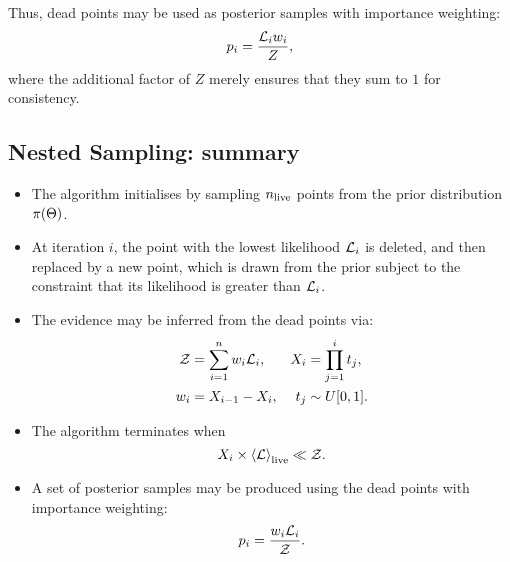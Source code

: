 Thus, dead points may be used as posterior samples with importance weighting:
\begin{equation}
  p_i = \frac{\mathcal{L}_i w_i}{Z},
  \label{eqn:bay:posterior_weight}
\end{equation}
where the additional factor of $Z$ merely ensures that they sum to $1$ for consistency.



\subsection{Nested Sampling: summary}
\label{sec:bay:comp_space}
\begin{itemize}
  \item The algorithm initialises by sampling $n_{\mathrm{live}}$ points from the prior distribution $\pi(\Theta)$. 
  \item At iteration $i$, the point with the lowest likelihood $\mathcal{L}_i$ is deleted, and then replaced by a new point, which is drawn from the prior subject to the constraint that its likelihood is greater than $\mathcal{L}_i$. 
  \item The evidence may be inferred from the dead points via:
    \begin{align}
      \mathcal{Z} &= \sum_{i=1}^n w_i \mathcal{L}_i, &
      X_i &= \prod_{j=1}^{i} t_j, \nonumber \\
      w_i &= X_{i-1}-X_{i},  & 
      t_j &\sim U[0,1].\nonumber 
    \end{align}
  \item The algorithm terminates when 
    \begin{equation}
      X_i \times {\left\langle{\mathcal{L}}\right\rangle}_{\mathrm{live}} \ll \mathcal{Z}.
    \end{equation}
  \item A set of posterior samples may be produced using the dead points with importance weighting:
    \begin{equation}
      p_i = \frac{w_i\mathcal{L}_i}{\mathcal{Z}}.\nonumber
    \end{equation}

\end{itemize}




